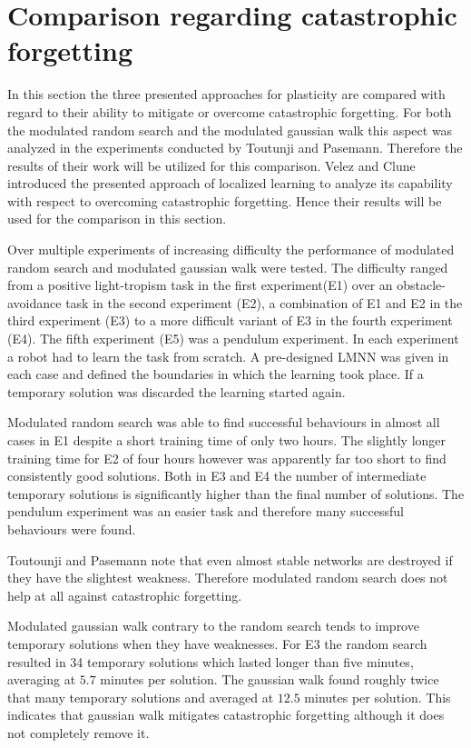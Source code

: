 \documentclass[12pt,twoside]{scrartcl}
\theoremstyle{plain}
\theoremstyle{definition}
\theoremstyle{remark}
\begin{document}
\section{Comparison regarding catastrophic forgetting}
\label{sec:comparison}

In this section the three presented approaches for plasticity are compared with
regard to their ability to mitigate or overcome catastrophic forgetting. For both
the modulated random search and the modulated gaussian walk this aspect was
analyzed in the experiments conducted by Toutunji and Pasemann\cite{Toutounji2016}.
Therefore the results of their work will be utilized for this comparison.
Velez and Clune\cite{Velez2017} introduced the presented approach of localized
learning to analyze its capability with respect to overcoming catastrophic
forgetting. Hence their results will be used for the comparison in this section.

Over multiple experiments of increasing difficulty the performance of modulated
random search and modulated gaussian walk were tested. The difficulty ranged
from a positive light-tropism task in the first experiment(E1) over an
obstacle-avoidance task in the second experiment (E2), a combination of E1 and E2
in the third experiment (E3) to a more difficult variant of E3 in the fourth
experiment (E4). The fifth experiment (E5) was a pendulum experiment.
In each experiment a robot had to learn the task from scratch. A pre-designed
LMNN was given in each case and defined the boundaries in which the learning
took place. If a temporary solution was discarded the learning started again.

Modulated random search was able to find successful behaviours in almost all
cases in E1 despite a short training time of only two hours. The slightly
longer training time for E2 of four hours however was apparently far too short
to find consistently good solutions. Both in E3 and E4 the number of intermediate
temporary solutions is significantly higher than the final number of solutions.
The pendulum experiment was an easier task and therefore many successful
behaviours were found.

Toutounji and Pasemann note that even almost stable networks are destroyed
if they have the slightest weakness. Therefore modulated random search
does not help at all against catastrophic forgetting.

Modulated gaussian walk contrary to the random search tends to improve temporary
solutions when they have weaknesses. For E3 the random search resulted in 34
temporary solutions which lasted longer than five minutes, averaging at \(5.7\)
minutes per solution. The gaussian walk found roughly twice that many temporary
solutions and averaged at \(12.5\) minutes per solution. This indicates that
gaussian walk mitigates catastrophic forgetting although it does not completely
remove it.
\end{document}
